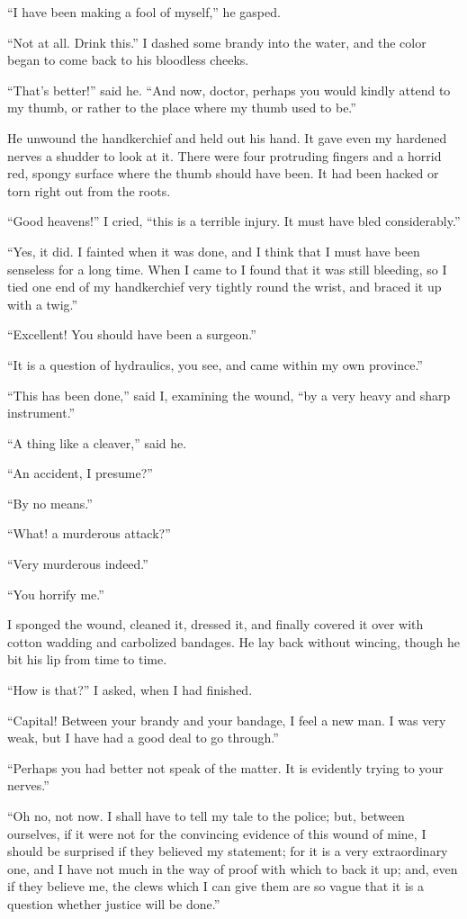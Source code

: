“I have been making a fool of myself,” he gasped.

“Not at all. Drink this.” I dashed some brandy into the
water, and the color began to come back to his bloodless
cheeks.

“That’s better!” said he. “And now, doctor, perhaps you
would kindly attend to my thumb, or rather to the place where
my thumb used to be.”

He unwound the handkerchief and held out his hand. It
gave even my hardened nerves a shudder to look at it. There
were four protruding fingers and a horrid red, spongy surface
where the thumb should have been. It had been hacked or
torn right out from the roots.

“Good heavens!” I cried, “this is a terrible injury. It
must have bled considerably.”

“Yes, it did. I fainted when it was done, and I think that
I must have been senseless for a long time. When I came
to I found that it was still bleeding, so I tied one end of my
handkerchief very tightly round the wrist, and braced it up
with a twig.”

“Excellent! You should have been a surgeon.”

“It is a question of hydraulics, you see, and came within
my own province.”

“This has been done,” said I, examining the wound, “by
a very heavy and sharp instrument.”

“A thing like a cleaver,” said he.

“An accident, I presume?”

“By no means.”

“What! a murderous attack?”

“Very murderous indeed.”

“You horrify me.”

I sponged the wound, cleaned it, dressed it, and finally covered
it over with cotton wadding and carbolized bandages.
He lay back without wincing, though he bit his lip from time
to time.

“How is that?” I asked, when I had finished.

“Capital! Between your brandy and your bandage, I feel
a new man. I was very weak, but I have had a good deal to
go through.”

“Perhaps you had better not speak of the matter. It is evidently
trying to your nerves.”

“Oh no, not now. I shall have to tell my tale to the police;
but, between ourselves, if it were not for the convincing
evidence of this wound of mine, I should be surprised if they
believed my statement; for it is a very extraordinary one, and
I have not much in the way of proof with which to back it up;
and, even if they believe me, the clews which I can give them
are so vague that it is a question whether justice will be
done.”

